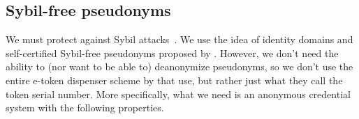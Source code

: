 \subsection{Sybil-free pseudonyms}%
\label{sybil-free-pseudonyms}

We must protect against Sybil attacks~\cite{SybilAttack}.
We use the idea of identity domains and self-certified Sybil-free pseudonyms 
proposed by \textcite{SelfCertifiedSybilFreePseudonyms}.
However, we don't need the ability to (nor want to be able to) deanonymize 
pseudonyms, so we don't use the entire e-token dispenser scheme by 
\textcite{HowToWinTheCloneWars} that 
\textcite{SelfCertifiedSybilFreePseudonyms} use, but rather just what they call 
the token serial number.
More specifically, what we need is an anonymous credential system with the 
following properties.

